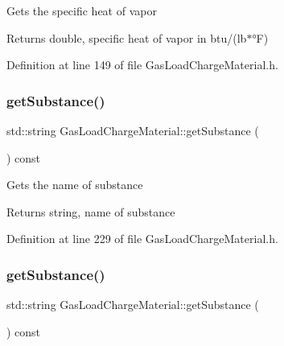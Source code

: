 Gets the specific heat of vapor \begin{DoxyReturn}{Returns}
double, specific heat of vapor in btu/(lb$\ast$°F) 
\end{DoxyReturn}


Definition at line 149 of file Gas\+Load\+Charge\+Material.\+h.

\mbox{\label{class_gas_load_charge_material_a5f967841f196f6b0b35f32f9610092e3}} 
\subsubsection{\texorpdfstring{get\+Substance()}{getSubstance()}\hspace{0.1cm}{\footnotesize\ttfamily [1/3]}}
{\footnotesize\ttfamily std\+::string Gas\+Load\+Charge\+Material\+::get\+Substance (\begin{DoxyParamCaption}{ }\end{DoxyParamCaption}) const\hspace{0.3cm}{\ttfamily [inline]}}

Gets the name of substance \begin{DoxyReturn}{Returns}
string, name of substance 
\end{DoxyReturn}


Definition at line 229 of file Gas\+Load\+Charge\+Material.\+h.

\mbox{\label{class_gas_load_charge_material_a5f967841f196f6b0b35f32f9610092e3}} 
\subsubsection{\texorpdfstring{get\+Substance()}{getSubstance()}\hspace{0.1cm}{\footnotesize\ttfamily [2/3]}}
{\footnotesize\ttfamily std\+::string Gas\+Load\+Charge\+Material\+::get\+Substance (\begin{DoxyParamCaption}{ }\end{DoxyParamCaption}) const\hspace{0.3cm}{\ttfamily [inline]}}

